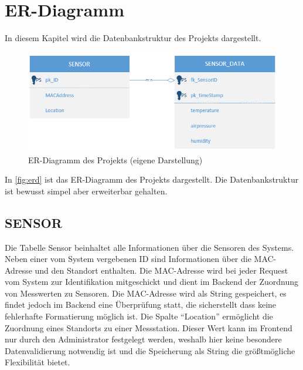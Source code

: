 \section{ER-Diagramm}\label{er-diagramm}
In diesem Kapitel wird die Datenbankstruktur des Projekts dargestellt.\\
\begin{figure}[h]
    \centering
    \includegraphics[width=1\linewidth]{img/erd}
    \caption[ER-Diagramm des Projekts]{ER-Diagramm des Projekts (eigene Darstellung)}
    \label{fig:erd}
\end{figure}

In \autoref{fig:erd} ist das ER-Diagramm des Projekts dargestellt. Die Datenbankstruktur ist bewusst simpel aber erweiterbar gehalten.
\subsection*{SENSOR}
Die Tabelle Sensor beinhaltet alle Informationen über die Sensoren des Systems.
Neben einer vom System vergebenen ID sind Informationen über die MAC-Adresse und den Standort enthalten.
Die MAC-Adresse wird bei jeder Request vom System zur Identifikation mitgeschickt und dient im Backend der Zuordnung von Messwerten zu Sensoren. Die MAC-Adresse wird als String gespeichert, es findet jedoch im Backend eine Überprüfung statt, die sicherstellt dass keine fehlerhafte Formatierung möglich ist.
Die Spalte \enquote{Location} ermöglicht die Zuordnung eines Standorts zu einer Messstation. Dieser Wert kann im Frontend nur durch den Administrator festgelegt werden, weshalb hier keine besondere Datenvalidierung notwendig ist und die Speicherung als String die größtmögliche Flexibilität bietet.

